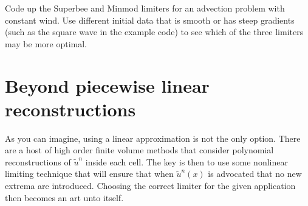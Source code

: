 \begin{problem}
Code up the Superbee and Minmod %
 limiters for an advection problem with constant wind.  Use different initial data that is smooth or has steep gradients (such as the square wave in the example code) to see which of the three limiters may be more optimal.
\end{problem}

\section*{Beyond piecewise linear reconstructions}
As you can imagine, using a linear approximation is not the only option.  There are a host of high order finite volume methods that consider polynomial reconstructions of $\tilde{u}^n$ inside each cell.  The key is then to use some nonlinear limiting technique that will ensure that when $\tilde{u}^n(x)$ is advocated that no new extrema are introduced.  Choosing the correct limiter for the given application then becomes an art unto itself.